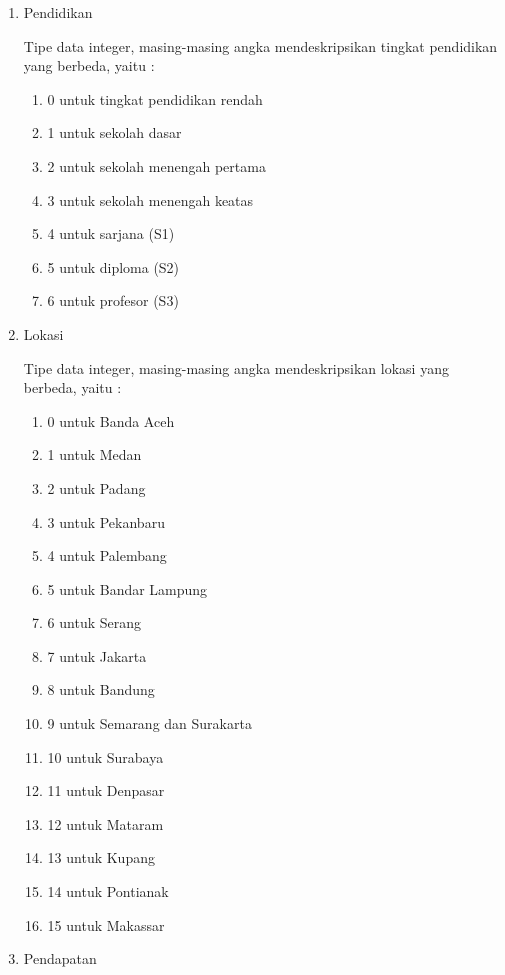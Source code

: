 \begin{enumerate}
		
		\item Pendidikan
		
		
		Tipe data integer, masing-masing angka mendeskripsikan tingkat pendidikan yang berbeda, yaitu :
		\begin{enumerate}
			\item 0 untuk tingkat pendidikan rendah
			\item 1 untuk sekolah dasar
			\item 2 untuk sekolah menengah pertama
			\item 3 untuk sekolah menengah keatas
			\item 4 untuk sarjana (S1)
			\item 5 untuk diploma (S2)
			\item 6 untuk profesor (S3)
		\end{enumerate}
		\item Lokasi
		
		
		Tipe data integer, masing-masing angka mendeskripsikan lokasi yang berbeda, yaitu :
		\begin{enumerate}
			\item 0 untuk Banda Aceh
			\item 1 untuk Medan
			\item 2 untuk Padang
			\item 3 untuk Pekanbaru
			\item 4 untuk Palembang
			\item 5 untuk Bandar Lampung
			\item 6 untuk Serang
			\item 7 untuk Jakarta
			\item 8 untuk Bandung
			\item 9 untuk Semarang dan Surakarta
			\item 10 untuk Surabaya
			\item 11 untuk Denpasar
			\item 12 untuk Mataram
			\item 13 untuk Kupang
			\item 14 untuk Pontianak
			\item 15 untuk Makassar
		\end{enumerate}
		\item Pendapatan
		

\end{enumerate}
